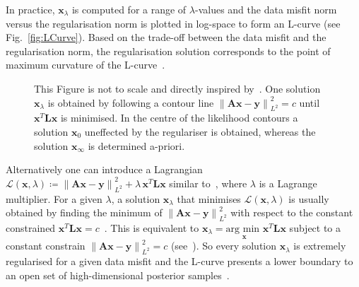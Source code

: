 In practice, $\bm{x}_{\lambda}$ is computed for a range of $\lambda$-values and the data misfit norm versus the regularisation norm is plotted in log-space to form an L-curve (see Fig.~\ref{fig:LCurve}).
Based on the trade-off between the data misfit and the regularisation norm, the regularisation solution corresponds to the point of maximum curvature of the L-curve~\cite{hansen1993use}.

\begin{figure}[ht!]
	\centering
	
	\caption[]{This Figure is not to scale and directly inspired by~\cite{ColinPhD}. One solution $\bm{x}_{\lambda}$ is obtained by following a contour line $\left\lVert \bm{A} \bm{x} -\bm{y} \right\rVert^2_{L^2}= c$ until $\bm{x}^T \bm{L} \bm{x}$ is minimised. In the centre of the likelihood contours a solution $\bm{x}_{0}$ uneffected by the regulariser is obtained, whereas the solution $\bm{x}_{\infty}$ is determined a-priori.}
	\label{fig:Langrangian}
\end{figure}
Alternatively one can introduce a Lagrangian $\mathcal{L}(\bm{x},\lambda)\coloneqq \left\lVert \bm{A} \bm{x} -\bm{y} \right\rVert^2_{L^2} + \lambda \, \bm{x}^T\bm{L} \bm{x}$ similar to~\cite{LiLagrange}, where $\lambda$ is a Lagrange multiplier.
For a given $\lambda$, a solution $\bm{x}_{\lambda} $ that minimises $\mathcal{L}(\bm{x},\lambda)$ is usually obtained by finding the minimum of $\left\lVert \bm{A} \bm{x} - \bm{y} \right\rVert^2_{L^2}$ with respect to the constant constrained $\bm{x}^T \bm{L} \bm{x} = c$~\cite[Fig.~2.13]{SANTOSH202265}.
This is equivalent to $\bm{x}_{\lambda}  = \underset{\bm{x}}{\text{arg min }}\bm{x}^T \bm{L} \bm{x}$ subject to a constant constrain $\left\lVert  \bm{A} \bm{x} -\bm{y} \right\rVert^2_{L^2}= c$ (see~\cite[fn.~6]{fox2016fast}). 
So every solution $\bm{x}_{\lambda}$ is extremely regularised for a given data misfit and the L-curve presents a lower boundary to an open set of high-dimensional posterior samples~\cite{VowelsMultiD}.
